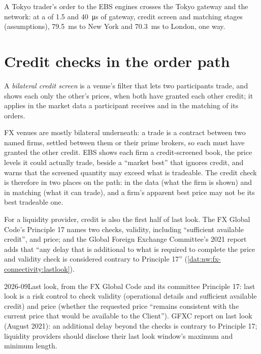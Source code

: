 A Tokyo trader's order to the EBS engines crosses the Tokyo gateway and the network: at a  of 1.5 and
\qty{40}{\micro\second} of gateway, credit screen and matching stages (assumptions), \qty{79.5}{\milli\second} to New York and
\qty{70.3}{\milli\second} to London, one way.

\section{Credit checks in the order path}

\begin{definition}\label{def:nw:fx-connectivity:credit}
A \emph{bilateral credit screen} is a venue's filter that lets two participants trade, and shows
each only the other's prices, when both have granted each other credit; it applies in the market data a participant receives and
in the matching of its orders.
\end{definition}

FX venues are mostly bilateral underneath: a trade is a contract between two named firms, settled between them or their prime
brokers, so each must have granted the other credit. EBS shows each firm a credit-screened book, the price levels it could
actually trade, beside a ``market best'' that ignores credit, and warns that the screened quantity may exceed what is tradeable.
The credit check is therefore in two places on the path: in the data (what the firm is shown) and in matching (what it can
trade), and a firm's apparent best price may not be its best tradeable one.

For a liquidity provider, credit is also the first half of last look. The FX Global Code's Principle 17 names two checks, validity,
including ``sufficient available credit'', and price; and the Global Foreign Exchange Committee's 2021 report adds that ``any delay
that is additional to what is required to complete the price and validity check is considered contrary to Principle 17''
(\cref{dat:nw:fx-connectivity:lastlook}).

\begin{dated}{2026-09}{Last look, from the FX Global Code and its committee}\label{dat:nw:fx-connectivity:lastlook}
Principle 17: last look is a risk control to check validity (operational details and sufficient available credit) and price (whether
the requested price ``remains consistent with the current price that would be available to the Client''). GFXC report on last look
(August 2021): an additional delay beyond the checks is contrary to Principle 17; liquidity providers should disclose their last
look window's maximum and minimum length.
\end{dated}

